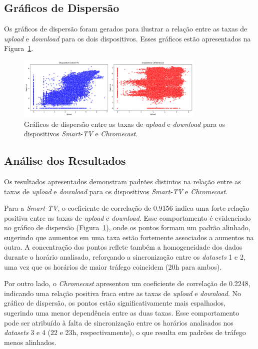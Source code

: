 \subsection{Gráficos de Dispersão}

Os gráficos de dispersão foram gerados para ilustrar a relação entre as taxas de \textit{upload} e \textit{download} para os dois dispositivos. Esses gráficos estão apresentados na Figura~\ref{fig:scatter_plot}.

\begin{figure}[H]
    \centering
    \includegraphics[width=0.8\textwidth]{../correlação/scatter_plot.png}
    \caption{Gráficos de dispersão entre as taxas de \textit{upload} e \textit{download} para os dispositivos \textit{Smart-TV} e \textit{Chromecast}.}
    \label{fig:scatter_plot}
\end{figure}

\subsection{Análise dos Resultados}

Os resultados apresentados demonstram padrões distintos na relação entre as taxas de \textit{upload} e \textit{download} para os dispositivos \textit{Smart-TV} e \textit{Chromecast}. 

Para a \textit{Smart-TV}, o coeficiente de correlação de 0.9156 indica uma forte relação positiva entre as taxas de \textit{upload} e \textit{download}. Esse comportamento é evidenciado no gráfico de dispersão (Figura~\ref{fig:scatter_plot}), onde os pontos formam um padrão alinhado, sugerindo que aumentos em uma taxa estão fortemente associados a aumentos na outra. A concentração dos pontos reflete também a homogeneidade dos dados durante o horário analisado, reforçando a sincronização entre os \textit{datasets} 1 e 2, uma vez que os horários de maior tráfego coincidem (20h para ambos).

Por outro lado, o \textit{Chromecast} apresentou um coeficiente de correlação de 0.2248, indicando uma relação positiva fraca entre as taxas de \textit{upload} e \textit{download}. No gráfico de dispersão, os pontos estão significativamente mais espalhados, sugerindo uma menor dependência entre as duas taxas. Esse comportamento pode ser atribuído à falta de sincronização entre os horários analisados nos \textit{datasets} 3 e 4 (22 e 23h, respectivamente), o que resulta em padrões de tráfego menos alinhados.

